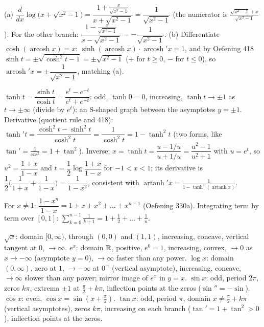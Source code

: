  (a) $\dfrac d{dx}\log\big(x+\sqrt{x^2-1}\big)=\dfrac{1+\frac x{\sqrt{x^2-1}}}{x+\sqrt{x^2-1}}=\dfrac1{\sqrt{x^2-1}}$ (the numerator is $\frac{\sqrt{x^2-1}+x}{\sqrt{x^2-1}}$). For the other branch: $\dfrac{1-\frac x{\sqrt{x^2-1}}}{x-\sqrt{x^2-1}}=-\dfrac1{\sqrt{x^2-1}}$. (b) Differentiate $\cosh(\operatorname{arcosh}x)=x$: $\sinh(\operatorname{arcosh}x)\cdot\operatorname{arcosh}'x=1$, and by Oefening 418 $\sinh t=\pm\sqrt{\cosh^2t-1}=\pm\sqrt{x^2-1}$ ($+$ for $t\ge0$, $-$ for $t\le0$), so $\operatorname{arcosh}'x=\pm\dfrac1{\sqrt{x^2-1}}$, matching (a).

 $\tanh t=\dfrac{\sinh t}{\cosh t}=\dfrac{e^t-e^{-t}}{e^t+e^{-t}}$: odd, $\tanh0=0$, increasing, $\tanh t\to\pm1$ as $t\to\pm\infty$ (divide by $e^{t}$): an S-shaped graph between the asymptotes $y=\pm1$. Derivative (quotient rule and 418): $\tanh't=\dfrac{\cosh^2t-\sinh^2t}{\cosh^2t}=\dfrac1{\cosh^2t}=1-\tanh^2t$ (two forms, like $\tan'=\frac1{\cos^2}=1+\tan^2$). Inverse: $x=\tanh t=\dfrac{u-1/u}{u+1/u}=\dfrac{u^2-1}{u^2+1}$ with $u=e^t$, so $u^2=\dfrac{1+x}{1-x}$ and $t=\dfrac12\log\dfrac{1+x}{1-x}$ for $-1<x<1$; its derivative is $\dfrac12\Big(\dfrac1{1+x}+\dfrac1{1-x}\Big)=\dfrac1{1-x^2}$, consistent with $\operatorname{artanh}'x=\frac1{1-\tanh^2(\operatorname{artanh}x)}$.

 For $x\ne1$: $\dfrac{1-x^n}{1-x}=1+x+x^2+\dots+x^{n-1}$ (Oefening 330a). Integrating term by term over $[0,1]$: $\sum_{k=0}^{n-1}\frac1{k+1}=1+\frac12+\dots+\frac1n$.

 $\sqrt x$: domain $[0,\infty)$, through $(0,0)$ and $(1,1)$, increasing, concave, vertical tangent at $0$, $\to\infty$. $e^x$: domain $\mathbb{R}$, positive, $e^0=1$, increasing, convex, $\to0$ as $x\to-\infty$ (asymptote $y=0$), $\to\infty$ faster than any power. $\log x$: domain $(0,\infty)$, zero at $1$, $\to-\infty$ at $0^+$ (vertical asymptote), increasing, concave, $\to\infty$ slower than any power; mirror image of $e^x$ in $y=x$. $\sin x$: odd, period $2\pi$, zeros $k\pi$, extrema $\pm1$ at $\frac\pi2+k\pi$, inflection points at the zeros ($\sin''=-\sin$). $\cos x$: even, $\cos x=\sin(x+\frac\pi2)$. $\tan x$: odd, period $\pi$, domain $x\ne\frac\pi2+k\pi$ (vertical asymptotes), zeros $k\pi$, increasing on each branch ($\tan'=1+\tan^2>0$), inflection points at the zeros.

